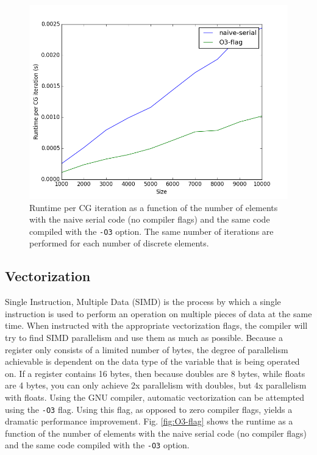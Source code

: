 \documentclass[10pt]{article}
\begin{document}
\begin{figure}[H]
\centering
\includegraphics[width=0.6\linewidth]{../figures/O3-flag-runtime-per-CG.png}
\caption{Runtime per CG iteration as a function of the number of elements with the naive serial code (no compiler flags) and the same code compiled with the {\tt -O3} option. The same number of iterations are performed for each number of discrete elements.}
\end{figure}

\subsection{Vectorization}

Single Instruction, Multiple Data (SIMD) is the process by which a single instruction is used to perform an operation on multiple pieces of data at the same time. When instructed with the appropriate vectorization flags, the compiler will try to find SIMD parallelism and use them as much as possible. Because a register only consists of a limited number of bytes, the degree of parallelism achievable is dependent on the data type of the variable that is being operated on. If a register contains 16 bytes, then because doubles are 8 bytes, while floats are 4 bytes, you can only achieve 2x parallelism with doubles, but 4x parallelism with floats. Using the GNU compiler, automatic vectorization can be attempted using the {\tt -O3} flag. Using this flag, as opposed to zero compiler flags, yields a dramatic performance improvement. Fig. \ref{fig:O3-flag} shows the runtime as a function of the number of elements with the naive serial code (no compiler flags) and the same code compiled with the {\tt -O3} option.

\end{document}
